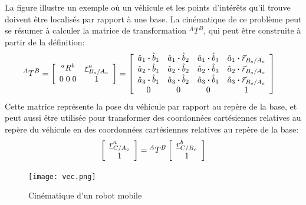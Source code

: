 \newpage
\begin{example}

La figure illustre un exemple où un véhicule et les points d’intérêts qu'il trouve doivent être localisés par rapport à une base. La cinématique de ce problème peut se résumer à calculer la matrice de transformation $^AT^B$, qui peut être construite à partir de la définition:
\begin{align}
{}^AT^B &= 
\left[ \begin{array}{c c } 
^aR^b & \underline{r}_{B_o/A_o}^a \\ 0 \; 0 \; 0 & 1
\end{array} \right] 
=
\left[ \begin{array}{c c c c} 
\hat{a}_1 \boldsymbol{\cdot} \hat{b}_1  &  \hat{a}_1 \boldsymbol{\cdot} \hat{b}_2  &  \hat{a}_1 \boldsymbol{\cdot} \hat{b}_3 & \hat{a}_1 \boldsymbol{\cdot} \vec{r}_{B_o/A_o} \\
\hat{a}_2 \boldsymbol{\cdot} \hat{b}_1  &  \hat{a}_2 \boldsymbol{\cdot} \hat{b}_2  &  \hat{a}_2 \boldsymbol{\cdot} \hat{b}_3 & \hat{a}_2 \boldsymbol{\cdot} \vec{r}_{B_o/A_o}\\
\hat{a}_3 \boldsymbol{\cdot} \hat{b}_1  &  \hat{a}_3 \boldsymbol{\cdot} \hat{b}_2  &  \hat{a}_3 \boldsymbol{\cdot} \hat{b}_3 & \hat{a}_3 \boldsymbol{\cdot} \vec{r}_{B_o/A_o} \\
0 & 0 & 0 & 1
\end{array} \right] 
\label{eq:transformationdef_app}
\end{align} 
Cette matrice représente la pose du véhicule par rapport au repère de la base, et peut aussi être utilisée pour transformer des coordonnées cartésiennes relatives au repère du véhicule en des coordonnées cartésiennes relatives au repère de la base:
\begin{align}
\left[ \begin{array}{c} 
\underline{r}_{C/A_o}^a \\ 1
\end{array} \right] 
= 
{}^AT^B
\left[ \begin{array}{c} 
\underline{r}_{C/B_o}^b \\ 1
\end{array} \right] 
\label{eq:homo1_app}
\end{align} 

\begin{figure}[H]
	\centering
		\texttt{[image: vec.png]}
	\caption{Cinématique d'un robot mobile}
	\label{fig:vec}
\end{figure}

\end{example}


